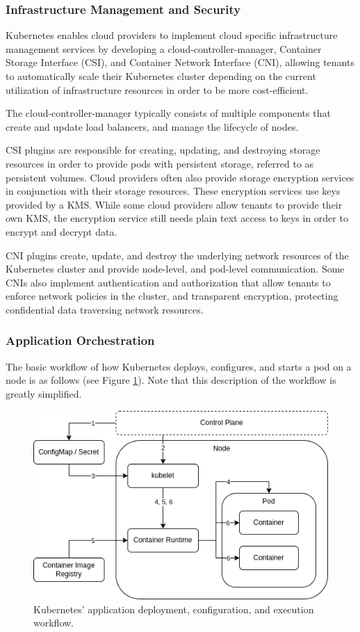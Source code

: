 \subsubsection{Infrastructure Management and Security}

Kubernetes enables cloud providers to implement cloud specific infrastructure
management services by developing a cloud-controller-manager, Container Storage
Interface (CSI), and Container Network Interface (CNI), allowing tenants to
automatically scale their Kubernetes cluster depending on the current
utilization of infrastructure resources in order to be more cost-efficient.

The cloud-controller-manager typically consists of multiple components that
create and update load balancers, and manage the lifecycle of nodes.

CSI plugins are responsible for creating, updating, and destroying storage
resources in order to provide pods with persistent storage, referred to as
persistent volumes. Cloud providers often also provide storage encryption
services in conjunction with their storage resources. These encryption services
use keys provided by a KMS. While some cloud providers allow tenants to provide
their own KMS, the encryption service still needs plain text access to keys in
order to encrypt and decrypt data.

CNI plugins create, update, and destroy the underlying network resources of the
Kubernetes cluster and provide node-level, and pod-level communication. Some
CNIs also implement authentication and authorization that allow tenants to
enforce network policies in the cluster, and transparent encryption, protecting
confidential data traversing network resources.

\subsubsection{Application Orchestration}

The basic workflow of how Kubernetes deploys, configures, and starts a pod on a
node is as follows (see Figure \ref{fig:kubernetes-application-orchestration}).
Note that this description of the workflow is greatly simplified.

\begin{figure}[H]
  \centering
  \includegraphics[width=0.7\linewidth]{resources/kubernetes-application-orchestration.drawio.png}
  \caption{Kubernetes' application deployment, configuration, and execution workflow.}
  \label{fig:kubernetes-application-orchestration}
\end{figure}

